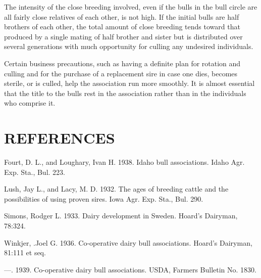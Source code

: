 The intensity of the close breeding involved, even if the bulls in the
bull circle are all fairly close relatives of each other, is not high. If the
initial bulls are half brothers of each other, the total amount of close
breeding tends toward that produced by a single mating of half brother
and sister but is distributed over several generations with much opportunity
for culling any undesired individuals.

Certain business precautions, such as having a definite plan for rotation
and culling and for the purchase of a replacement sire in case one
dies, becomes sterile, or is culled, help the association run more smoothly.
It is almost essential that the title to the bulls rest in the association
rather than in the individuals who comprise it.

\section*{REFERENCES}

\begin{hangparas}{0.5in}{1}%
Fourt, D. L., and Loughary, Ivan H. 1938. Idaho bull associations. Idaho Agr. Exp.
Sta., Bul. 223.

Lush, Jay L., and Lacy, M. D. 1932. The ages of breeding cattle and the possibilities
of using proven sires. Iowa Agr. Exp. Sta., Bul. 290.

Simons, Rodger L. 1933. Dairy development in Sweden. Hoard's Dairyman, 78:324.

Winkjer, .Joel G. 1936. Co-operative dairy bull associations. Hoard's Dairyman,
81:111 et seq.

---. 1939. Co-operative dairy bull associations. USDA, Farmers Bulletin
No. 1830.
\end{hangparas}